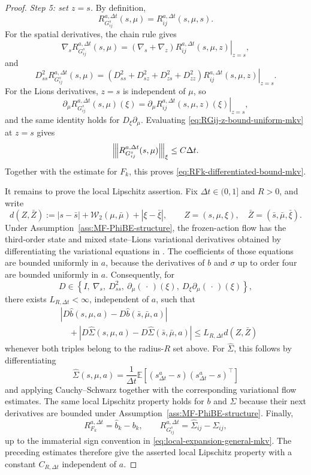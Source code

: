 \documentclass[a4paper, 10pt, english, reqno]{amsart}
\newcommand{\tnorm}[1]{\left\vert\kern-0.25ex\left\vert\kern-0.25ex\left\vert #1
\right\vert\kern-0.25ex\right\vert\kern-0.25ex\right\vert}
\begin{document}
\begin{proof}
\emph{Step 5: set $z=s$.}
By definition,
\[
  R_{G_{ij}^s}^{a,\Delta t}(s,\mu)
  =
  R_{ij}^{a,\Delta t}(s,\mu,s).
\]
For the spatial derivatives, the chain rule gives
\[
\nabla_s R_{G_{ij}^s}^{a,\Delta t}(s,\mu)
=
\left.
(\nabla_s+\nabla_z)R_{ij}^{a,\Delta t}(s,\mu,z)
\right|_{z=s},
\]
and
\[
D_{ss}^2R_{G_{ij}^s}^{a,\Delta t}(s,\mu)
=
\left.
(D_{ss}^2+D_{sz}^2+D_{zs}^2+D_{zz}^2)
R_{ij}^{a,\Delta t}(s,\mu,z)
\right|_{z=s}.
\]
For the Lions derivatives, $z=s$ is independent of $\mu$, so
\[
\partial_\mu R_{G_{ij}^s}^{a,\Delta t}(s,\mu)(\xi)
=
\left.
\partial_\mu R_{ij}^{a,\Delta t}(s,\mu,z)(\xi)
\right|_{z=s},
\]
and the same identity holds for $D_\xi\partial_\mu$. Evaluating \eqref{eq:RGij-z-bound-uniform-mkv} at $z=s$ gives
\[
  \tnorm{R_{G_{ij}^s}^{a,\Delta t}(s,\mu)}_{\xi}
  \le C\Delta t .
\]
Together with the estimate for $F_k$, this proves
\eqref{eq:RFk-differentiated-bound-mkv}.

It remains to prove the local Lipschitz assertion. Fix
$\Delta t\in(0,1]$ and $R>0$, and write
\[
d(Z,\bar Z)
:=
|s-\bar s|+\mathcal W_2(\mu,\bar\mu)+|\xi-\bar\xi|,
\qquad
Z=(s,\mu,\xi),\quad
\bar Z=(\bar s,\bar\mu,\bar\xi).
\]
Under Assumption~\ref{ass:MF-PhiBE-structure}, the frozen-action flow
has the third-order state and mixed state--Lions variational derivatives
obtained by differentiating the variational equations in
\cite[Lemma~A.4]{firstpaper}. The coefficients of those equations are
bounded uniformly in $a$, because the derivatives of $b$ and $\sigma$
up to order four are bounded uniformly in $a$. Consequently, for
\[
D\in
\left\{
I,\ \nabla_s,\ D_{ss}^2,\
\partial_\mu(\,\cdot\,)(\xi),\
D_\xi\partial_\mu(\,\cdot\,)(\xi)
\right\},
\]
there exists $L_{R,\Delta t}<\infty$, independent of $a$, such that
\[
\begin{aligned}
&|D\hat b(s,\mu,a)-D\hat b(\bar s,\bar\mu,a)|\\
&\quad+
|D\hat\Sigma(s,\mu,a)-D\hat\Sigma(\bar s,\bar\mu,a)|
\le
L_{R,\Delta t}d(Z,\bar Z)
\end{aligned}
\]
whenever both triples belong to the radius-$R$ set above. For
$\hat\Sigma$, this follows by differentiating
\[
\hat\Sigma(s,\mu,a)
=
\frac1{\Delta t}
\mathbb E\!\left[(s_{\Delta t}^a-s)(s_{\Delta t}^a-s)^\top\right]
\]
and applying Cauchy--Schwarz together with the corresponding variational
flow estimates. The same local Lipschitz property holds for $b$ and
$\Sigma$ because their next derivatives are bounded under
Assumption~\ref{ass:MF-PhiBE-structure}. Finally,
\[
R_{F_k}^{a,\Delta t}=\hat b_k-b_k,
\qquad
R_{G_{ij}^s}^{a,\Delta t}=\hat\Sigma_{ij}-\Sigma_{ij},
\]
up to the immaterial sign convention in
\eqref{eq:local-expansion-general-mkv}. The preceding estimates therefore
give the asserted local Lipschitz property with a constant
$C_{R,\Delta t}$ independent of $a$.
\end{proof}
\end{document}
